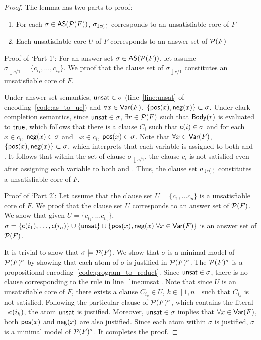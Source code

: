 \begin{proof}
  The lemma has two parts to proof:
  \begin{enumerate}
    \item For each $\sigma \in \mathsf{AS}(\mathcal{P}(F))$, $\sigma_{\downarrow \mathsf{c}(.)}$ corresponds to an unsatisfiable core of $F$
    \item Each unsatisfiable core $U$ of $F$ corresponds to an answer set of $\mathcal{P}(F)$ 
  \end{enumerate}
  Proof of `Part $1$': For an answer set $\sigma \in \mathsf{AS}(\mathcal{P}(F))$, let assume $\sigma_{\downarrow c/1} = \{c_{i_1}, \ldots, c_{i_k}\}$.
  We proof that the clause set of $\sigma_{\downarrow c/1}$ constitutes an unsatisfiable core of $F$.

  Under answer set semantics, $\mathsf{unsat} \in \sigma$ (line~\ref{line:unsat} of encoding~\ref{code:as_to_uc}) and $\forall x \in \mathsf{Var}(F)$, $\{\mathsf{pos}(x), \mathsf{neg}(x)\} \subset \sigma$.
  Under clark completion semantics, since $\mathsf{unsat} \in \sigma$, $\exists r \in \mathcal{P}(F)$ such that 
  $\mathsf{Body}(r)$ is evaluated to $\mathsf{true}$, which follows that there is a clause $C_i$ such that 
  $\mathsf{c}(i) \in \sigma$ and for each $x \in c_i$, $\mathsf{neg}(x) \in \sigma$ and $\neg{x} \in c_i$, $\mathsf{pos}(x) \in \sigma$.
  Note that $\forall x \in \mathsf{Var}(F)$, $\{\mathsf{pos}(x), \mathsf{neg}(x)\} \subset \sigma$, which interprets that each variable is assigned to both \true and \false.
  It follows that within the set of clause $\sigma_{\downarrow c/1}$, the clause $c_i$ is not satisfied even after assigning each variable to both \true and \false. 
  Thus, the clause set $\sigma_{\downarrow \mathsf{c}(.)}$ constitutes a unsatisfiable core of $F$.

  Proof of `Part $2$': Let assume that the clause set $U = \{c_1, \ldots c_n\}$ is a unsatisfiable core of $F$.
  We proof that the clause set $U$ corresponds to an answer set of $\mathcal{P}(F)$. We show that given $U = \{c_{i_1}, \ldots c_{i_n}\}$, 
  $\sigma = \{\mathsf{c}(i_1), \ldots, \mathsf{c}(i_n)\} \cup \{\mathsf{unsat}\} \cup \{\mathsf{pos}(x), \mathsf{neg}(x)| \forall x \in \mathsf{Var}(F)\}$ is an answer set of $\mathcal{P}(F)$.
  
  It is trivial to show that $\sigma \models \mathcal{P}(F)$. We show that  $\sigma$ is a minimal model of $\mathcal{P}(F)^{\sigma}$ by showing that each atom of $\sigma$ is justified in $\mathcal{P}(F)^{\sigma}$. 
  The $\mathcal{P}(F)^{\sigma}$ is a propositional encoding~\ref{code:program_to_reduct}.
  Since $\mathsf{unsat} \in \sigma$, there is no clause corresponding to the rule in line~\ref{line:unsat}. 
  Note that since $U$ is an unsatisfiable core of $F$, there exists a clause $C_{i_k} \in U$, $k \in [1,n]$ such that $C_{i_k}$ is not satisfied.
  Following the particular clause of $\mathcal{P}(F)^{\sigma}$, which contains the literal $\neg \mathsf{c}(i_k)$, the atom $\mathsf{unsat}$ is justified. 
  Moreover, $\mathsf{unsat} \in \sigma$ implies that $\forall x \in \mathsf{Var}(F)$, both $\mathsf{pos}(x)$ and $\mathsf{neg}(x)$ are also justified.
  Since each atom within $\sigma$ is justified, $\sigma$ is a minimal model of $\mathcal{P}(F)^{\sigma}$. It completes the proof. 
\end{proof}
